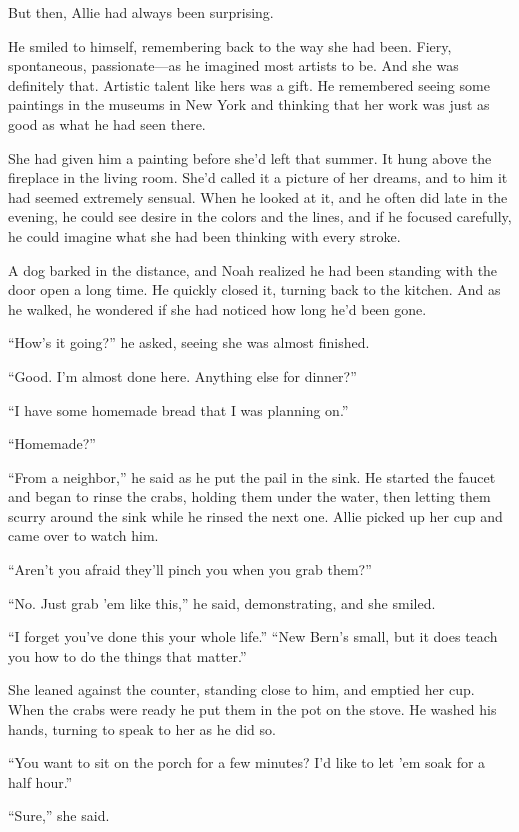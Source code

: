 \documentclass[10pt, twoside, openright]{book}
\begin{document}
But then, Allie had always been surprising.


He smiled to himself, remembering back to the way she had been. Fiery,
spontaneous, passionate---as he imagined most artists to be. And she was
definitely that. Artistic talent like hers was a gift. He remembered
seeing some paintings in the museums in New York and thinking that her
work was just as good as what he had seen there.

She had given him a painting before she'd left that summer. It hung
above the fireplace in the living room. She'd called it a picture of her
dreams, and to him it had seemed extremely sensual. When he looked at
it, and he often did late in the evening, he could see desire in the
colors and the lines, and if he focused carefully, he could imagine what
she had been thinking with every stroke.

A dog barked in the distance, and Noah realized he had been standing
with the door open a long time. He quickly closed it, turning back to
the kitchen. And as he walked, he wondered if she had noticed how long
he'd been gone.


``How's it going?'' he asked, seeing she was almost finished.

``Good. I'm almost done here. Anything else for dinner?''

``I have some homemade bread that I was planning on.''

``Homemade?''


``From a neighbor,'' he said as he put the pail in the sink. He started
the faucet and began to rinse the crabs, holding them under the water,
then letting them scurry around the sink while he rinsed the next one.
Allie picked up her cup and came over to watch him.


``Aren't you afraid they'll pinch you when you grab them?''

``No. Just grab 'em like this,'' he said, demonstrating, and she smiled.


``I forget you've done this your whole life.'' ``New Bern's small, but
it does teach you how to do the things that matter.''

She leaned against the counter, standing close to him, and emptied her
cup. When the crabs were ready he put them in the pot on the stove. He
washed his hands, turning to speak to her as he did so.

``You want to sit on the porch for a few minutes? I'd like to let 'em
soak for a half hour.''


``Sure,'' she said.
\end{document}
